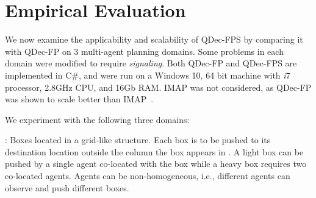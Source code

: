 \documentclass[letterpaper]{article} %
\theoremstyle{definition}
\begin{document}


\section{Empirical Evaluation}

We now examine the applicability and scalability of QDec-FPS by comparing it with QDec-FP on 3 multi-agent planning domains.
Some problems in each domain were modified to require \emph{signaling}.
%
Both QDec-FP and QDec-FPS are  implemented in C\#, and were run on a Windows 10, 64 bit machine with \emph{i}7 processor, 2.8GHz CPU, and 16Gb RAM.
IMAP was not considered, as QDec-FP was  shown to scale better than IMAP~\citep{IMAP}.

We experiment with the following three domains:

: Boxes located in a grid-like structure. Each box is to be pushed to its destination location
outside the column the box appears in \citep{BrafmanSZ13}.
A light box can be pushed by a single agent co-located with the box while a heavy box requires two co-located agents. 
Agents can be non-homogeneous, i.e., different agents can observe and push different boxes.
\end{document}
